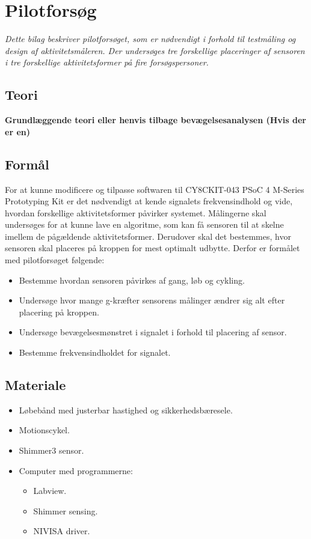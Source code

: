\chapter{Pilotforsøg}\vspace{-.75cm}
\textit{Dette bilag beskriver pilotforsøget, som er nødvendigt i forhold til testmåling og design af aktivitetsmåleren. Der undersøges tre forskellige placeringer af sensoren i tre forskellige aktivitetsformer på fire forsøgspersoner.}

\section{Teori}
\textbf{Grundlæggende teori eller henvis tilbage bevægelsesanalysen (Hvis der er en)}

\section{Formål}
For at kunne modificere og tilpasse softwaren til CY8CKIT-043 PSoC 4 M-Series Prototyping Kit er det nødvendigt at kende signalets frekvensindhold og vide, hvordan forskellige aktivitetsformer påvirker systemet. Målingerne skal undersøges for at kunne lave en algoritme, som kan få sensoren til at skelne imellem de pågældende aktivitetsformer. Derudover skal det bestemmes, hvor sensoren skal placeres på kroppen for mest optimalt udbytte. Derfor er formålet med pilotforsøget følgende:
\begin{itemize}
	\item Bestemme hvordan sensoren påvirkes af gang, løb og cykling.
	\item Undersøge hvor mange g-kræfter sensorens målinger ændrer sig alt efter placering på kroppen.
	\item Undersøge bevægelsesmønstret i signalet i forhold til placering af sensor.
	\item Bestemme frekvensindholdet for signalet.
\end{itemize}

\section{Materiale}
\begin{itemize}
	\item Løbebånd med justerbar hastighed og sikkerhedsbæresele.
	\item Motionscykel.
	\item Shimmer3 sensor.
	\item Computer med programmerne:
	\begin{itemize}
		\item Labview.
		\item Shimmer sensing.
		\item NIVISA driver.
	\end{itemize}
\end{itemize}

